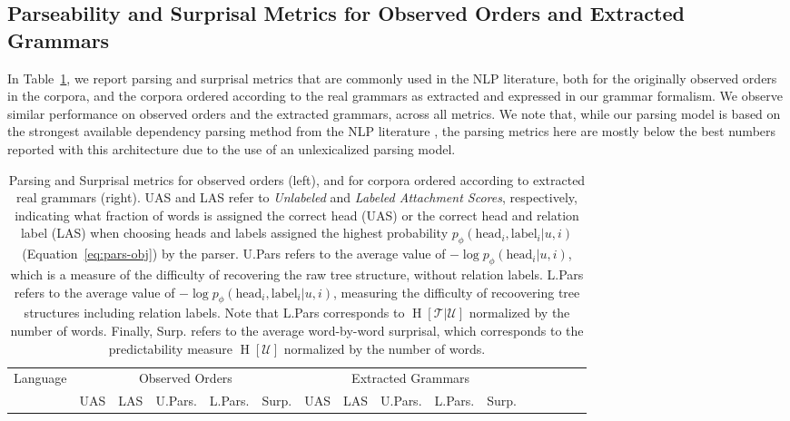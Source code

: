 \documentclass[10pt,twoside,lineno]{article}
\newcommand{\utterance}{\mathcal{U}}
\newcommand{\tree}{\mathcal{T}}
\begin{document}
\subsection{Parseability and Surprisal Metrics for Observed Orders and Extracted Grammars}

In Table~\ref{tab:observed-and-extracted}, we report parsing and surprisal metrics that are commonly used in the NLP literature, both for the originally observed orders in the corpora, and the corpora ordered according to the real grammars as extracted and expressed in our grammar formalism.
We observe similar performance on observed orders and the extracted grammars, across all metrics.
We note that, while our parsing model is based on the strongest available dependency parsing method from the NLP literature \cite{dozat2017stanford,zeman2018proceedings,che2018towards}, the parsing metrics here are mostly below the best numbers reported with this architecture \cite{zeman2018proceedings} due to the use of an unlexicalized parsing model.


\begin{table}
\centering
\small{
\begin{tabular}{l||ll|ll|l||ll|ll|l|lllll}
	Language & \multicolumn{5}{c||}{Observed Orders} & \multicolumn{5}{c|}{Extracted Grammars} \\ 
	& UAS & LAS & U.Pars. & L.Pars. & Surp. & UAS & LAS & U.Pars. & L.Pars. & Surp.\\ \hline \hline

\end{tabular}
}
	\caption{Parsing and Surprisal metrics for observed orders (left), and for corpora ordered according to extracted real grammars (right). UAS and LAS refer to \emph{Unlabeled} and \emph{Labeled Attachment Scores}, respectively, indicating what fraction of words is assigned the correct head (UAS) or the correct head and relation label (LAS) when choosing heads and labels assigned the highest probability $p_\phi(\text{head}_i, \text{label}_i | u, i)$ (Equation~\ref{eq:pars-obj}) by the parser.
	U.Pars refers to the average value of $- \log p_\phi(\text{head}_i| u, i)$, which is a measure of the difficulty of recovering the raw tree structure, without relation labels. 
	L.Pars refers to the average value of $- \log p_\phi(\text{head}_i, \text{label}_i| u, i)$, measuring the difficulty of recoovering tree structures including relation labels.
	Note that L.Pars corresponds to $\operatorname{H}[\tree|\utterance]$ normalized by the number of words.
	Finally, Surp. refers to the average word-by-word surprisal, which corresponds to the predictability measure $\operatorname{H}[\utterance]$ normalized by the number of words.
	}\label{tab:observed-and-extracted}
\end{table}
\end{document}
